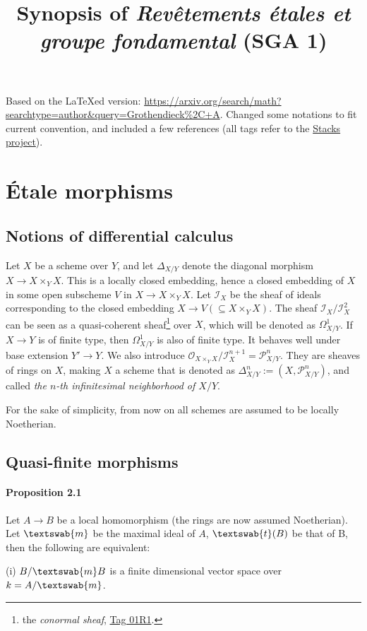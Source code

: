 \documentclass[11pt]{article}
\begin{document}
\title{Synopsis of \textit{Revêtements étales et groupe fondamental} (SGA 1)}
Based on the \LaTeX ed version: \url{https://arxiv.org/search/math?searchtype=author&query=Grothendieck%2C+A}. Changed some notations to fit current convention, and included a few references (all tags refer to the \href{https://stacks.math.columbia.edu}{Stacks project}).


\section{Étale morphisms}
\subsection{Notions of differential calculus}
Let $X$ be a scheme over $Y$, and let $\Delta_{X/Y}$ denote the diagonal morphism $X\to X\times_Y X$. This is a locally closed embedding, hence a closed embedding of $X$ in some open subscheme $V$ in $X\to X\times_Y X$. Let $\mathscr{I}_X$ be the sheaf of ideals corresponding to the closed embedding $X\to V(\subseteq X\times_Y X)$. The sheaf $\mathscr{I}_X/\mathscr{I}_X^2$ can be seen as a quasi-coherent sheaf\footnote{the \textit{conormal sheaf}, \href{https://stacks.math.columbia.edu/tag/01R1}{Tag 01R1}.} over $X$, which will be denoted as $\Omega^1_{X/Y}$. If $X\to Y$ is of finite type, then $\Omega^1_{X/Y}$ is also of finite type. It behaves well under base extension $Y'\to Y$. We also introduce $\mathscr{O}_{X\times_Y X}/\mathscr{I}_X^{n+1}=\mathscr{P}^n_{X/Y}$. They are sheaves of rings on $X$, making $X$ a scheme that is denoted as $\Delta^n_{X/Y}:=(X,\mathscr{P}^n_{X/Y})$, and called \textit{the $n$-th infinitesimal neighborhood of $X/Y$}.

For the sake of simplicity, from now on all schemes are assumed to be locally Noetherian.

\subsection{Quasi-finite morphisms}
\paragraph{Proposition 2.1} Let $A\to B$ be a local homomorphism (the rings are now assumed Noetherian). Let $\textswab{m}$ be the maximal ideal of $A$, $\textswab{t}(B)$ be that of B, then the following are equivalent:

(i) $B/\textswab{m}B$ is a finite dimensional vector space over $k=A/\textswab{m}$.
\end{document}
